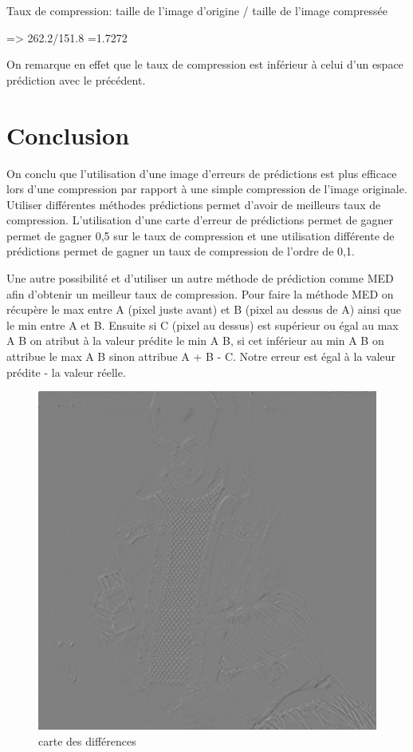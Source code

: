 \documentclass{article}
\begin{document}
Taux de compression: taille de l'image d'origine / taille de l'image compressée

=> 262.2/151.8 =1.7272

On remarque en effet que le taux de compression est inférieur à celui d'un espace prédiction avec le précédent.


\newpage
{}
\section*{Conclusion}
On conclu que l'utilisation d'une image d'erreurs de prédictions est plus efficace lors d'une compression par rapport à une simple compression de l'image originale.
Utiliser différentes méthodes prédictions permet d'avoir de meilleurs taux de compression.
L'utilisation d'une carte d'erreur de prédictions permet de gagner permet de gagner 0,5 sur le taux de compression et une utilisation différente de prédictions permet de gagner un taux de compression de l'ordre de 0,1.

Une autre possibilité et d'utiliser  un autre méthode de prédiction comme MED afin d'obtenir un meilleur taux de compression.
Pour faire la méthode MED on récupère le max entre A (pixel juste avant) et B (pixel au dessus de A) ainsi que le min entre A et B.
Ensuite si C (pixel au dessus) est supérieur ou égal au max A B on atribut à la valeur prédite le min A B, si cet inférieur au min A B on attribue le max A B sinon attribue A + B - C.
Notre erreur est égal à la valeur prédite - la valeur réelle.

\begin{figure}[h]
\centerline{\includegraphics[scale=0.4]{./rendus/MaribaultErreurPredMED.png} }
\caption{carte des différences}
\end{figure}
\end{document}

